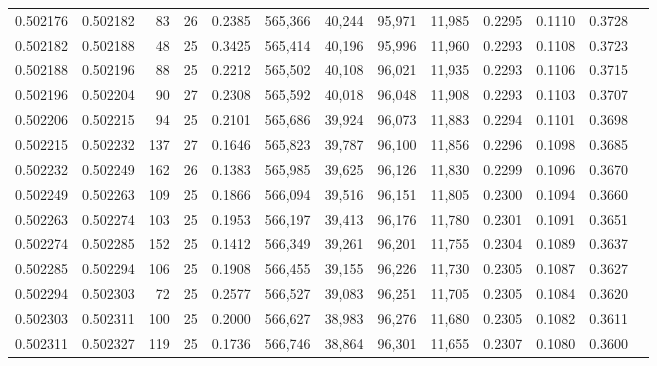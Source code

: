 \begin{tabular}{rrrrrrrrrrrrr}
0.502176 & 0.502182 &  83 &  26 &                                     0.2385 & 565,366 &  40,244 &  95,971 &  11,985 & 0.2295 & 0.1110 & 0.3728 \\
0.502182 & 0.502188 &  48 &  25 &                                     0.3425 & 565,414 &  40,196 &  95,996 &  11,960 & 0.2293 & 0.1108 & 0.3723 \\
0.502188 & 0.502196 &  88 &  25 &                                     0.2212 & 565,502 &  40,108 &  96,021 &  11,935 & 0.2293 & 0.1106 & 0.3715 \\
0.502196 & 0.502204 &  90 &  27 &                                     0.2308 & 565,592 &  40,018 &  96,048 &  11,908 & 0.2293 & 0.1103 & 0.3707 \\
0.502206 & 0.502215 &  94 &  25 &                                     0.2101 & 565,686 &  39,924 &  96,073 &  11,883 & 0.2294 & 0.1101 & 0.3698 \\
0.502215 & 0.502232 & 137 &  27 &                                     0.1646 & 565,823 &  39,787 &  96,100 &  11,856 & 0.2296 & 0.1098 & 0.3685 \\
0.502232 & 0.502249 & 162 &  26 &                                     0.1383 & 565,985 &  39,625 &  96,126 &  11,830 & 0.2299 & 0.1096 & 0.3670 \\
0.502249 & 0.502263 & 109 &  25 &                                     0.1866 & 566,094 &  39,516 &  96,151 &  11,805 & 0.2300 & 0.1094 & 0.3660 \\
0.502263 & 0.502274 & 103 &  25 &                                     0.1953 & 566,197 &  39,413 &  96,176 &  11,780 & 0.2301 & 0.1091 & 0.3651 \\
0.502274 & 0.502285 & 152 &  25 &                                     0.1412 & 566,349 &  39,261 &  96,201 &  11,755 & 0.2304 & 0.1089 & 0.3637 \\
0.502285 & 0.502294 & 106 &  25 &                                     0.1908 & 566,455 &  39,155 &  96,226 &  11,730 & 0.2305 & 0.1087 & 0.3627 \\
0.502294 & 0.502303 &  72 &  25 &                                     0.2577 & 566,527 &  39,083 &  96,251 &  11,705 & 0.2305 & 0.1084 & 0.3620 \\
0.502303 & 0.502311 & 100 &  25 &                                     0.2000 & 566,627 &  38,983 &  96,276 &  11,680 & 0.2305 & 0.1082 & 0.3611 \\
0.502311 & 0.502327 & 119 &  25 &                                     0.1736 & 566,746 &  38,864 &  96,301 &  11,655 & 0.2307 & 0.1080 & 0.3600 \\

\end{tabular}
